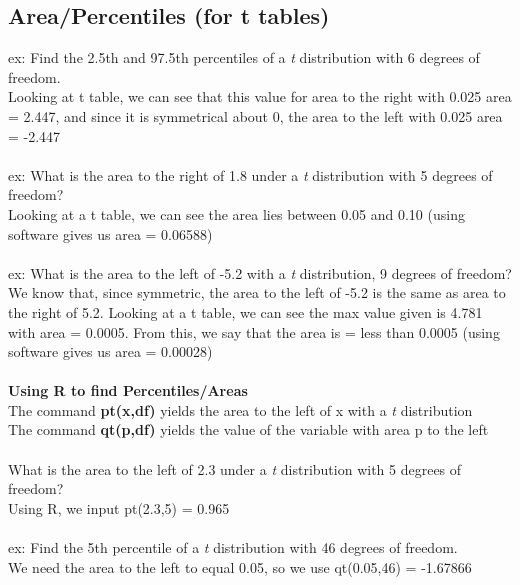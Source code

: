 \documentclass[12pt, a4paper]{article}
\begin{document}
	\subsection{Area/Percentiles (for t tables)}
	ex: Find the 2.5th and 97.5th percentiles of a \textit{t} distribution with 6 degrees of freedom. \\
	Looking at t table, we can see that this value for area to the right with 0.025 area = 2.447, and since it is symmetrical about 0, the area to the left with 0.025 area = -2.447 \\~\\
	ex: What is the area to the right of 1.8 under a \textit{t} distribution with 5 degrees of freedom? \\
	Looking at a t table, we can see the area lies between 0.05 and 0.10 (using software gives us area = 0.06588) \\~\\
	ex: What is the area to the left of -5.2 with a \textit{t} distribution, 9 degrees of freedom? \\
	We know that, since symmetric, the area to the left of -5.2 is the same as area to the right of 5.2. Looking at a t table, we can see the max value given is 4.781 with area = 0.0005. From this, we say that the area is = less than 0.0005 (using software gives us area = 0.00028) \\~\\
	\textbf{Using R to find Percentiles/Areas} \\
	The command \textbf{pt(x,df)} yields the area to the left of x with a \textit{t} distribution \\
	The command \textbf{qt(p,df)} yields the value of the variable with area p to the left \\~\\
	What is the area to the left of 2.3 under a \textit{t} distribution with 5 degrees of freedom? \\
	Using R, we input pt(2.3,5) = 0.965 \\~\\
	ex: Find the 5th percentile of a \textit{t} distribution with 46 degrees of freedom. \\
	We need the area to the left to equal 0.05, so we use qt(0.05,46) = -1.67866 \\~\\
	
\end{document}
